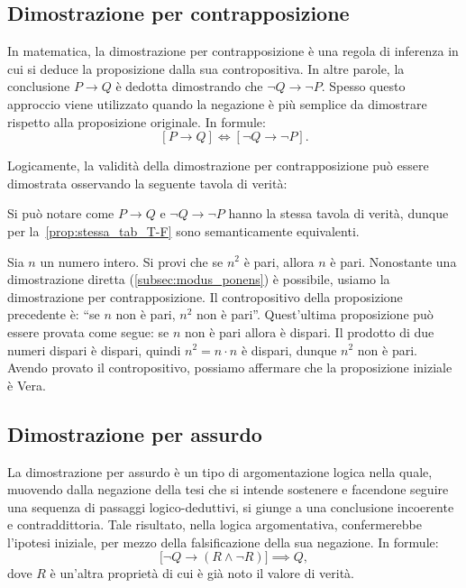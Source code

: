 \subsection{Dimostrazione per contrapposizione}\label{subsec:dim_contrapposizione}
In matematica, la dimostrazione per contrapposizione è una regola di inferenza in cui si deduce la proposizione dalla sua contropositiva. In altre parole, la conclusione \(P \longrightarrow Q\) è dedotta dimostrando che \(\neg Q \longrightarrow \neg P\). Spesso questo approccio viene utilizzato quando la negazione è più semplice da dimostrare rispetto alla proposizione originale. In formule:
\[
    [P \longrightarrow Q] \iff [\neg Q \longrightarrow \neg P].
\]

Logicamente, la validità della dimostrazione per contrapposizione può essere dimostrata osservando la seguente tavola di verità:

Si può notare come \(P \longrightarrow Q\) e \(\neg Q \longrightarrow \neg P\) hanno la stessa tavola di verità, dunque per la~\cref{prop:stessa_tab_T-F} sono semanticamente equivalenti.

\begin{example}
    Sia \(n\) un numero intero. Si provi che se \(n^2\) è pari, allora \(n\) è pari. Nonostante una dimostrazione diretta (\cref{subsec:modus_ponens}) è possibile, usiamo la dimostrazione per contrapposizione. Il contropositivo della proposizione precedente è: ``se \(n\) non è pari, \(n^2\) non è pari''. Quest'ultima proposizione può essere provata come segue: se \(n\) non è pari allora è dispari. Il prodotto di due numeri dispari è dispari, quindi \(n^2 = n \cdot n\) è dispari, dunque \(n^2\) non è pari.
    Avendo provato il contropositivo, possiamo affermare che la proposizione iniziale è Vera.
\end{example}


\subsection{Dimostrazione per assurdo}\label{subsec:dimostrazione_per_assurdo}
La dimostrazione per assurdo è un tipo di argomentazione logica nella quale, muovendo dalla negazione della tesi che si intende sostenere e facendone seguire una sequenza di passaggi logico-deduttivi, si giunge a una conclusione incoerente e contraddittoria. Tale risultato, nella logica argomentativa, confermerebbe l'ipotesi iniziale, per mezzo della falsificazione della sua negazione. In formule:
\[
    \big[\neg Q \longrightarrow (R \land \neg R)\big] \implies Q,
\]
dove \(R\) è un'altra proprietà di cui è già noto il valore di verità.

